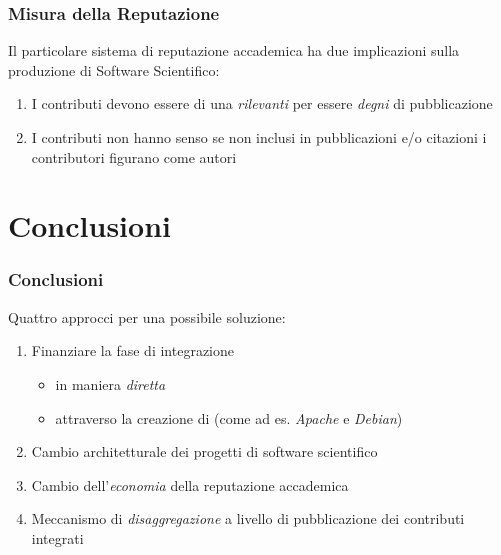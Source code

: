 \begin{frame}\frametitle{Misura della Reputazione}

\Large{Il particolare sistema di reputazione accademica ha due implicazioni sulla produzione di Software Scientifico:}

\begin{enumerate}[<+->]
\def\labelenumi{\arabic{enumi}.}
\itemsep1pt\parskip0pt
\item
  I contributi devono essere di una \emph{rilevanti} per essere
  \emph{degni} di pubblicazione
\item
  I contributi non hanno senso se non inclusi in pubblicazioni e/o
  citazioni i contributori figurano come autori
\end{enumerate}

\end{frame}

\section{Conclusioni}

\begin{frame}\frametitle{Conclusioni}

\Large

Quattro approcci per una possibile soluzione:

\begin{enumerate}[<+->]
\def\labelenumi{\arabic{enumi}.}
\itemsep1pt\parskip0pt
\item
  Finanziare la fase di integrazione

  \begin{itemize}[<+->]
  \itemsep1pt\parskip0pt
  \item
    in maniera \emph{diretta}
  \item
    attraverso la creazione di  (come ad es.
    \emph{Apache} e \emph{Debian})
  \end{itemize}
\item
  Cambio architetturale dei progetti di software scientifico
\item
  Cambio dell'\emph{economia} della reputazione accademica
\item
  Meccanismo di \emph{disaggregazione} a livello di pubblicazione dei
  contributi integrati
\end{enumerate}

\end{frame}
